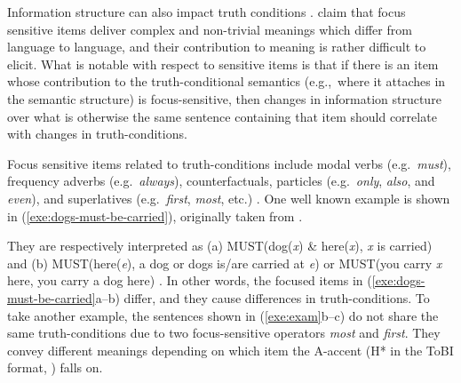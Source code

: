 Information structure can also impact truth conditions
\citep{partee:91,gundel:99}. \citet{beaver:clark:08} claim that focus sensitive items
deliver complex and non-trivial meanings which differ from language to
language, and their contribution to meaning is rather difficult to
elicit.  What is notable with respect to  sensitive items
is that if there is an item whose contribution to the
truth-conditional semantics (e.g.,\ where it attaches in the semantic
structure) is focus-sensitive, then changes in information structure
over what is otherwise the same sentence containing that item should
correlate with changes in truth-conditions.


Focus sensitive items related to truth-conditions include modal verbs
(e.g.\ \textit{must}), frequency adverbs (e.g.\ \textit{always}),
counterfactuals,  particles (e.g.\ \textit{only},
\textit{also}, and \textit{even}), and superlatives
(e.g.\ \textit{first}, \textit{most}, etc.)  \citep{partee:91}.  One
well known example is shown in (\ref{exe:dogs-must-be-carried}),
originally taken from \citet{halliday:70}.




\noindent They are respectively interpreted as (a)
MUST(dog(\textit{x}) \& here(\textit{x}), \textit{x} is carried) and
(b) MUST(here(\textit{e}), a dog or dogs is/are carried at \textit{e})
or MUST(you carry \textit{x} here, you carry a dog here)
\citep[169]{partee:91}.  In other words, the focused items in
(\ref{exe:dogs-must-be-carried}a--b) differ, and they cause
differences in truth-conditions. To take another
example, the sentences shown in (\ref{exe:exam}b--c) do not share the
same truth-conditions due to two focus-sensitive operators
\textit{most} and \textit{first}.  They convey different meanings
depending on which item the A-accent (H* in the ToBI format,
\citealt{bolinger:61,jackendoff:72}) falls
on.





